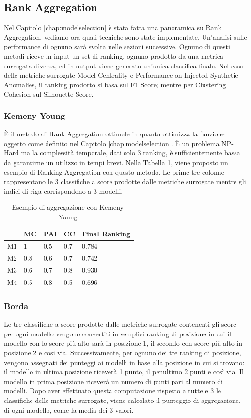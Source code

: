 \subsection{Rank Aggregation}
Nel Capitolo \ref{chap:modelselection} è stata fatta una panoramica su Rank Aggregation, vediamo ora quali tecniche sono state implementate. Un'analisi sulle performance di ognuno sarà svolta nelle sezioni successive.
Ognuno di questi metodi riceve in input un set di ranking, ognuno prodotto da una metrica surrogata diversa, ed in output viene generato un'unica classifica finale.
Nel caso delle metriche surrogate Model Centrality e Performance on Injected Synthetic Anomalies, il ranking prodotto si basa sul F1 Score; mentre per Clustering Cohesion sul Silhouette Score.
\subsubsection{Kemeny-Young}
È il metodo di Rank Aggregation ottimale in quanto ottimizza la funzione oggetto come definito nel Capitolo \ref{chap:modelselection}. È un problema NP-Hard ma la complessità temporale, dati solo 3 ranking, è sufficientemente bassa da garantirne un utilizzo in tempi brevi. Nella Tabella \ref{kemeny-young}, viene proposto un esempio di Ranking Aggregation con questo metodo. Le prime tre colonne rappresentano le 3 classifiche a score prodotte dalle metriche surrogate mentre gli indici di riga corrispondono a 3 modelli.
\begin{table}
	\centering
	\caption{\label{kemeny-young}Esempio di aggregazione con Kemeny-Young.}
	\begin{tabular}{|l|l|l|l|l|} 
		\hline
		   & MC  & PAI & CC  & Final Ranking \\ 
		\hline
		M1 & 1   & 0.5 & 0.7 & 0.784         \\ 
		\hline
		M2 & 0.8 & 0.6 & 0.7 & 0.742         \\ 
		\hline
		M3 & 0.6 & 0.7 & 0.8 & 0.930         \\ 
		\hline
		M4 & 0.5 & 0.8 & 0.5 & 0.696         \\
		\hline
	\end{tabular}
\end{table}

\subsubsection{Borda}
Le tre classifiche a score prodotte dalle metriche surrogate contenenti gli score per ogni modello vengono convertiti in semplici ranking di posizione in cui il modello con lo score più alto sarà in posizione 1, il secondo con score più alto in posizione 2 e cosi via. 
Successivamente, per ognuno dei tre ranking di posizione, vengono assegnati dei punteggi ai modelli in base alla posizione in cui si trovano: il modello in ultima posizione riceverà 1 punto, il penultimo 2 punti e così via. Il modello in prima posizione riceverà un numero di punti pari al numero di modelli. 
Dopo aver effettuato questa computazione rispetto a tutte e 3 le classifiche delle metriche surrogate, viene calcolato il punteggio di aggregazione, di ogni modello, come la media dei 3 valori.


